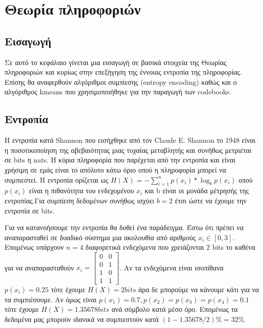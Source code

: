 ﻿\chapter{Θεωρία πληροφοριών}
\label{chapter:chap3}

\section{Εισαγωγή}
\label{section:sect31}

\indent Σε αυτό το κεφάλαιο γίνεται μια εισαγωγή σε βασικά στοιχεία της Θεωρίας πληροφοριών και κυρίως στην επεξήγηση της έννοιας εντροπία της πληροφορίας. Επίσης θα αναφερθούν αλγόριθμοι συμπίεσης (entropy encoding) καθώς και ο αλγόριθμος kmeans που χρησιμοποιήθηκε για την παραγωγή των codebooks.

\section{Εντροπία}
\label{section:sect32}

\indent Η εντροπία κατά Shannon που εισήχθηκε από τον Claude E. Shannon το 1948 είναι η ποσοτικοποίηση της αβεβαιότητας μιας τυχαίας μεταβλητής και συνήθως μετριέται σε bits η nats. Η κύρια πληροφορία που παρέχεται από την εντροπία και είναι χρήσιμη σε εμάς είναι το απόλυτο κάτω όριο οπού η πληροφορία μπορεί να συμπιεστεί. Η εντροπία ορίζεται ως $ H(X) = -\sum_{i=1}^{n} p(x_i)*\log_{b} p(x_i) $  οπού $p(x_i)$ είναι η πιθανότητα του ενδεχομένου $x_i$ και b είναι οι μονάδα μέτρησής της εντροπίας.Για συμπίεση δεδομένων συνήθως ισχύει $b=2$ έτσι ώστε να έχουμε την εντροπία σε bits.

\indent Για να κατανοήσουμε την εντροπία θα δοθεί ένα παράδειγμα. Έστω ότι πρέπει να αναπαρασταθεί σε δυαδικό σύστημα μια ακολουθία από αριθμούς $x_i \in [0,3] $. Επομένως υπάρχουν $n=4$ διαφορετικά ενδεχόμενα που χρειάζονται 2 bits το καθένα για να αναπαρασταθούν
$x_i = \begin{bmatrix}
0 & 0 \\
0 & 1 \\
1 & 0 \\
1 & 1
\end{bmatrix} $. Αν τα ενδεχόμενα είναι ισοπίθανα $ p(x_i)= 0.25 $ τότε έχουμε $ H(X) = 2bits $ άρα δε μπορούμε να κάνουμε κάτι για να τα συμπιέσουμε. Αν όμως είναι $ p(x_1) = 0.7, p(x_2)=p(x_3)=p(x_4)=0.1 $ τότε έχουμε $ H(X) = 1.35678 bits$ ανά σύμβολο κατά μέσο όρο. Επομένως τα δεδομένα μας μπορούν ιδανικά να συμπιεστούν κατά $(1-1.35678/2)\% = 32\%$.

